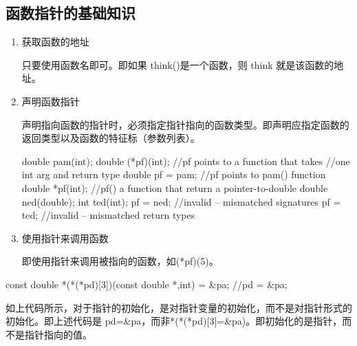 \subsection{函数指针的基础知识}
\begin{enumerate}
	\item 获取函数的地址
	
	只要使用函数名即可。即如果 think()是一个函数，则 think 就是该函数的地址。
	\item 声明函数指针
	
	声明指向函数的指针时，必须指定指针指向的函数类型。即声明应指定函数的返回类型以及函数的特征标（参数列表）。
\begin{ccode}
double pam(int);
double (*pf)(int); //pf points to a function that takes 
//one int arg and return type double
pf = pam; //pf points to pam() function
double *pf(int); //pf() a function that return a pointer-to-double
double ned(double); 
int ted(int);
pf = ned; //invalid -- mismatched signatures
pf = ted; //invalid -- mismatched return types
\end{ccode}
	\item 使用指针来调用函数
	
	即使用指针来调用被指向的函数，如(*pf)(5)。
\end{enumerate}
\begin{ccode}
const double *(*(*pd)[3])(const double *,int) = &pa;
//pd = &pa;
\end{ccode}
如上代码所示，对于指针的初始化，是对指针变量的初始化，而不是对指针形式的初始化。即上述代码是 {\color{red}pd=\&pa}，而非{\color{red}*(*(*pd)[3]=\&pa)}。即初始化的是指针，而不是指针指向的值。